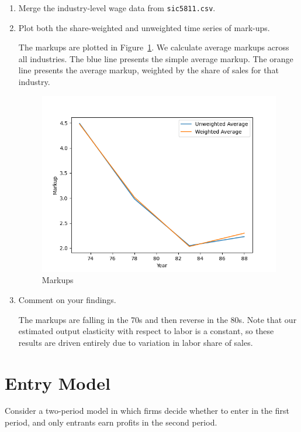 \documentclass{article}
\begin{document}
\begin{enumerate}
\item Merge the industry-level wage data from \texttt{sic5811.csv}.
\item Plot both the share-weighted and unweighted time series of mark-ups. 

\begin{answer}
The markups are plotted in Figure~\ref{fig:markups}. We calculate average markups across all industries. The blue line presents the simple average markup. The orange line presents the average markup, weighted by the share of sales for that industry.

\begin{figure}[H]
    \centering
    \caption{Markups}
    \label{fig:markups}\includegraphics[width=0.5\linewidth]{Problem Set 2/markup_timeseries.png}
\end{figure}

\end{answer}


\item Comment on your findings. 

\begin{answer}
The markups are falling in the 70s and then reverse in the 80s. Note that our estimated output elasticity with respect to labor is a constant, so these results are driven entirely due to variation in labor share of sales. 
\end{answer}

\end{enumerate}

\section{Entry Model}

Consider a two-period model in which firms decide whether to enter in the first period, and only entrants earn profits in the second period.
\end{document}
